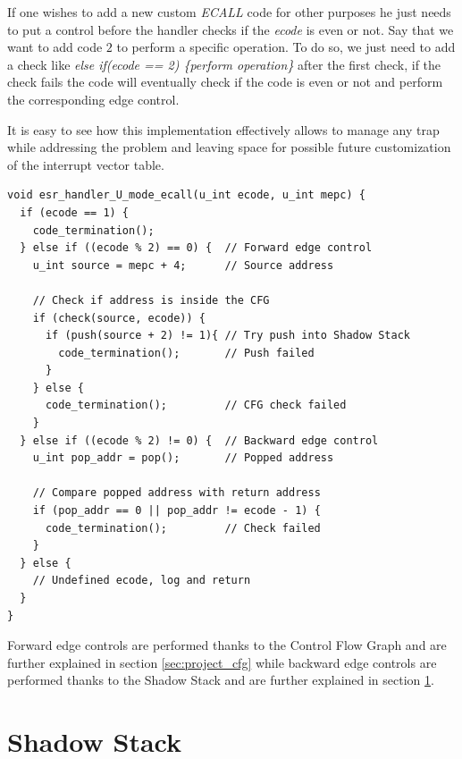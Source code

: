 If one wishes to add a new custom \textit{ECALL} code for other purposes he just
needs to put a control before the handler checks if the \textit{ecode} is even or
not. Say that we want to add code $2$ to perform a specific operation. To do so,
we just need to add a check like \textit{else if(ecode == 2) \{perform operation\}}
after the first check, if the check fails the code will eventually check if the
code is even or not and perform the corresponding edge control.

It is easy to see how this implementation effectively allows to manage any trap
while addressing the problem and leaving space for possible future customization
of the interrupt vector table. \\ \begin{lstlisting}[style=CStyle, caption = U-mode \textit{ECALL} handler, label={lst:ecallhandler}]
void esr_handler_U_mode_ecall(u_int ecode, u_int mepc) {
  if (ecode == 1) {
    code_termination();
  } else if ((ecode % 2) == 0) {  // Forward edge control
    u_int source = mepc + 4;      // Source address

    // Check if address is inside the CFG
    if (check(source, ecode)) {
      if (push(source + 2) != 1){ // Try push into Shadow Stack
        code_termination();       // Push failed
      }
    } else {
      code_termination();         // CFG check failed
    }
  } else if ((ecode % 2) != 0) {  // Backward edge control
    u_int pop_addr = pop();       // Popped address

    // Compare popped address with return address
    if (pop_addr == 0 || pop_addr != ecode - 1) {
      code_termination();         // Check failed
    }
  } else {
    // Undefined ecode, log and return
  }
}
\end{lstlisting}

Forward edge controls are performed thanks to the Control Flow Graph and are
further explained in section \ref{sec:project_cfg} while backward edge controls
are performed thanks to the Shadow Stack and are further explained in section
\ref{sec:project_ss}.

\section{Shadow Stack}
\label{sec:project_ss}

